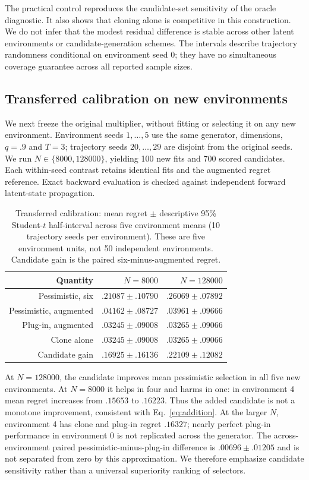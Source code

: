 \documentclass[11pt]{article}
\begin{document}
The practical control reproduces the candidate-set sensitivity of the oracle
diagnostic. It also shows that cloning alone is competitive in this
construction. We do not infer that the modest residual difference is stable
across other latent environments or candidate-generation schemes. The intervals
describe trajectory randomness conditional on environment seed 0; they have no
simultaneous coverage guarantee across all reported sample sizes.

\subsection{Transferred calibration on new environments}
We next freeze the original multiplier, without fitting or selecting it on any
new environment. Environment seeds $1,\ldots,5$ use the same generator,
dimensions, $q=.9$ and $T=3$; trajectory seeds $20,\ldots,29$ are disjoint
from the original seeds. We run $N\in\{8000,128000\}$, yielding 100 new
fits and 700 scored candidates. Each within-seed contrast retains identical
fits and the augmented regret reference. Exact backward evaluation is checked
against independent forward latent-state propagation.

\begin{table}[t]
\centering\small
\caption{Transferred calibration: mean regret $\pm$ descriptive 95\%
Student-$t$ half-interval across five environment means (10 trajectory
seeds per environment). These are five environment units, not 50 independent
environments. Candidate gain is the paired six-minus-augmented regret.}
\begin{tabular}{rrr}\toprule
Quantity & $N=8000$ & $N=128000$\\\midrule
Pessimistic, six & $.21087\pm.10790$ & $.26069\pm.07892$\\
Pessimistic, augmented & $.04162\pm.08727$ & $.03961\pm.09666$\\
Plug-in, augmented & $.03245\pm.09008$ & $.03265\pm.09066$\\
Clone alone & $.03245\pm.09008$ & $.03265\pm.09066$\\
Candidate gain & $.16925\pm.16136$ & $.22109\pm.12082$\\\bottomrule
\end{tabular}\label{tab:transfer}
\end{table}

At $N=128000$, the candidate improves mean pessimistic selection in all five
new environments. At $N=8000$ it helps in four and harms in one: in
environment 4 mean regret increases from $.15653$ to $.16223$.
Thus the added candidate is not a monotone improvement, consistent with
Eq.~\eqref{eq:addition}. At the larger $N$, environment 4 has clone and
plug-in regret $.16327$; nearly perfect plug-in performance in environment 0
is not replicated across the generator. The across-environment paired
pessimistic-minus-plug-in difference is $.00696\pm.01205$ and is not
separated from zero by this approximation. We therefore emphasize candidate
sensitivity rather than a universal superiority ranking of selectors.
\end{document}
